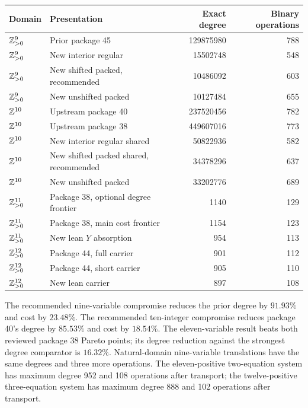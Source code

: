 \begin{center}\small
\begin{tabular}{llrr}
\toprule
Domain & Presentation & Exact degree & Binary operations\\\midrule
$\mathbb Z_{>0}^9$ & Prior package 45 & 129875980 & 788\\
$\mathbb Z_{>0}^9$ & New interior regular & 15502748 & 548\\
$\mathbb Z_{>0}^9$ & New shifted packed, recommended & 10486092 & 603\\
$\mathbb Z_{>0}^9$ & New unshifted packed & 10127484 & 655\\\addlinespace
$\mathbb Z^{10}$ & Upstream package 40 & 237520456 & 782\\
$\mathbb Z^{10}$ & Upstream package 38 & 449607016 & 773\\
$\mathbb Z^{10}$ & New interior regular shared & 50822936 & 582\\
$\mathbb Z^{10}$ & New shifted packed shared, recommended & 34378296 & 637\\
$\mathbb Z^{10}$ & New unshifted packed & 33202776 & 689\\\addlinespace
$\mathbb Z_{>0}^{11}$ & Package 38, optional degree frontier & 1140 & 129\\
$\mathbb Z_{>0}^{11}$ & Package 38, main cost frontier & 1154 & 123\\
$\mathbb Z_{>0}^{11}$ & New lean $Y$ absorption & 954 & 113\\\addlinespace
$\mathbb Z_{>0}^{12}$ & Package 44, full carrier & 901 & 112\\
$\mathbb Z_{>0}^{12}$ & Package 44, short carrier & 905 & 110\\
$\mathbb Z_{>0}^{12}$ & New lean carrier & 897 & 108\\\bottomrule
\end{tabular}
\end{center}
The recommended nine-variable compromise reduces the prior degree by
$91.93\%$ and cost by $23.48\%$. The recommended ten-integer compromise
reduces package 40's degree by $85.53\%$ and cost by $18.54\%$.
The eleven-variable result beats both reviewed package 38 Pareto points;
its degree reduction against the strongest degree comparator is $16.32\%$.
Natural-domain nine-variable translations have the same degrees and three
more operations. The eleven-positive two-equation system has maximum degree
952 and 108 operations after transport; the twelve-positive three-equation
system has maximum degree 888 and 102 operations after transport.
